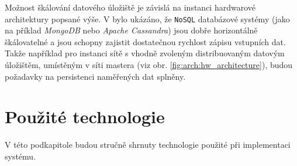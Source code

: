 Možnost škálování datového úložiště je závislá na instanci hardwarové architektury popsané výše. V \cite{gandini2014performance} bylo ukázáno, že \texttt{NoSQL} databázové systémy (jako na příklad \textit{MongoDB} nebo \textit{Apache Cassandra}) jsou dobře horizontálně škálovatelné a jsou schopny zajistit dostatečnou rychlost zápisu vstupních dat. Takže například pro instanci sítě s vhodně zvoleným distribuovaným datovým úložištěm, umístěným v síti mastera (viz obr. \ref{fig:arch:hw_architecture}), budou požadavky na persistenci naměřených dat splněny.

\section{Použité technologie}\label{chap:arch:technologie}
V této podkapitole budou stručně shrnuty technologie použité při implementaci systému.

